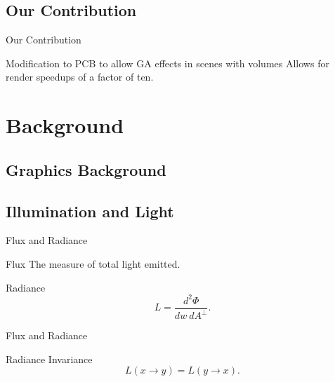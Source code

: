 \documentclass[compress,professionalfont]{beamer}
\begin{document}
\subsection{Our Contribution}
\begin{frame}{Our Contribution}

Modification to PCB to allow GA effects in scenes with volumes
Allows for render speedups of a factor of ten.

\end{frame}




\section{Background}
\subsection{Graphics Background}
\subsection{Illumination and Light}
\begin{frame}{Flux and Radiance}

    \begin{block}{Flux}
        The measure of total light emitted. 
    \end{block}  

    \begin{block}{Radiance}
        \[
        \mathit{L} = \frac{\mathit{d^{2}\Phi}}{\mathit{dw\:dA}^\perp}.
        \]


    \end{block}

\end{frame}




\begin{frame}{Flux and Radiance}

    

    \begin{block}{Radiance Invariance}
        \[
            L(x \to y) = L(y \to x).
        \]
    \end{block}

\end{frame}
\end{document}
